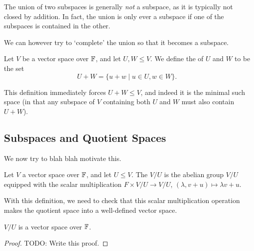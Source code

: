 \documentclass[a4paper]{scrartcl}
\begin{document}
The union of two subspaces is generally \emph{not} a subspace, as it is typically not closed by addition. In fact, the union is only ever a subspace if one of the subspaces is contained in the other. 

We can however try to `complete' the union so that it becomes a subspace.

\begin{definition}
    Let $V$ be a vector space over $\mathbb{F}$, and let $U, W \leq V$. We define the  of $U$ and $W$ to be the set
    $$
    U + W = \{u + w \mid u \in U, w \in W \}.
    $$
\end{definition}

This definition immediately forces $U + W \leq V$, and indeed it is the minimal such space (in that any subspace of $V$ containing both $U$ and $W$ must also contain $U + W$).

\subsection{Subspaces and Quotient Spaces}

We now try to blah blah motivate this.

\begin{definition}
    Let $V$ a vector space over $\mathbb{F}$, and let $U \leq V$. The  $V/U$ is the abelian group $V/U$ equipped with the scalar multiplication $F \times V/U \rightarrow V/U$, $(\lambda, v + u) \mapsto \lambda v + u$.
\end{definition}

With this definition, we need to check that this scalar multiplication operation makes the quotient space into a well-defined vector space.

\begin{proposition}
    $V/U$ is a vector space over $\mathbb{F}$.
\end{proposition}
\begin{proof}
    TODO: Write this proof.
\end{proof}
\end{document}
